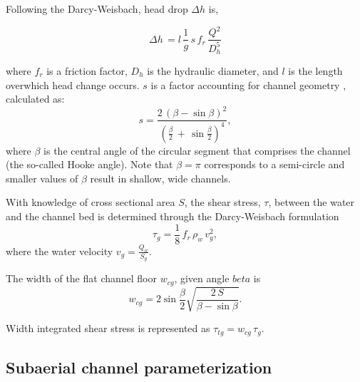 \documentclass[draft]{agujournal2019}
\begin{document}
Following the Darcy-Weisbach, head drop $\Delta h$ is,
\begin{linenomath*}
  \begin{equation}
    \label{eq:dh}
    \Delta h \,  = l \,\frac{1}{g}\,s\,f_r\,\frac{Q^2}{D_h^5}
  \end{equation}
\end{linenomath*}
\noindent where $f_r$ is a friction factor, $D_h$ is the hydraulic diameter, and $l$ is the length overwhich head change occurs. $s$ is a factor accounting for channel geometry \cite{hooke1990}, calculated as:
\begin{equation}
  \label{eq:Hf}
  s = \frac{2\,(\beta -\sin \beta)^2}{(\frac{\beta}{2}\,+\,\sin \frac{\beta}{2})^4},
\end{equation}
where $\beta$ is the central angle of the circular segment that comprises the channel (the so-called Hooke angle). Note that $\beta =\pi$ corresponds to a semi-circle and
smaller values of $\beta$ result in shallow, wide channels.

With knowledge of cross sectional area $S$, the shear stress, $\tau$, between the water and the channel bed is determined through the Darcy-Weisbach formulation
\begin{equation}
  \label{eq:tau}
  \tau_g=\frac{1}{8}\,f_r\,\rho_w\,v_g^2,
\end{equation}
% 
where  the water velocity $v_g = \frac{Q_w}{S_g}$.

The width of the flat channel floor $w_{cg}$, given angle $beta$ is 
\begin{equation}
  \label{eq:dh2wc}
  w_{cg} = 2  \sin \frac{\beta}{2} \sqrt{\frac{2\, S}{\beta -\sin \beta}}.
\end{equation}

Width integrated shear stress is represented as $\tau_{tg}=w_{cg}\,\tau_g $.

\subsection{Subaerial channel  parameterization}
\label{sect:fluv}
\end{document}
